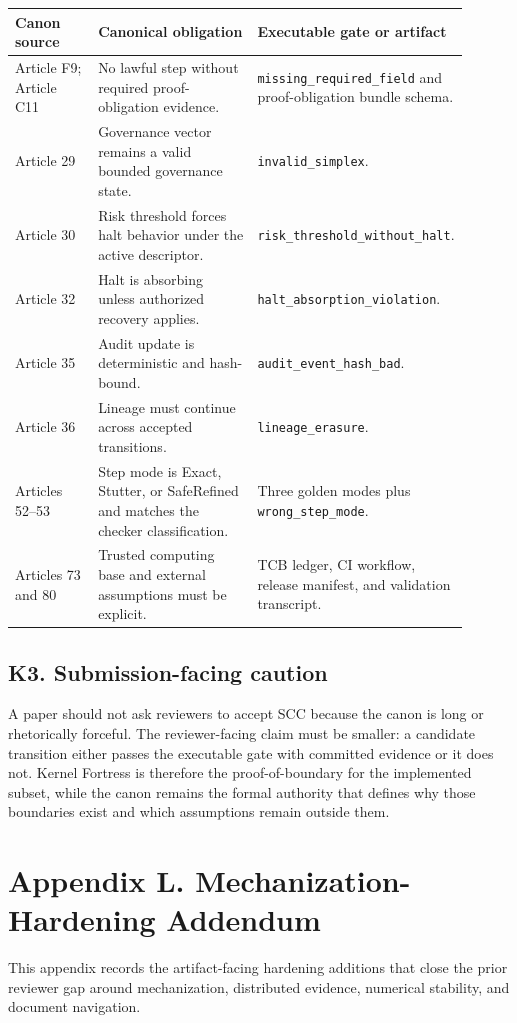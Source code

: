 \documentclass[10pt,oneside]{article}
\theoremstyle{definition}
\theoremstyle{remark}
\begin{document}
\begin{longtable}{@{}p{0.20\linewidth}p{0.40\linewidth}p{0.30\linewidth}@{}}
\toprule
\textbf{Canon source} & \textbf{Canonical obligation} & \textbf{Executable gate or artifact} \\
\midrule
Article F9; Article C11 & No lawful step without required proof-obligation evidence. & \texttt{missing\_required\_field} and proof-obligation bundle schema. \\
Article 29 & Governance vector remains a valid bounded governance state. & \texttt{invalid\_simplex}. \\
Article 30 & Risk threshold forces halt behavior under the active descriptor. & \texttt{risk\_threshold\_without\_halt}. \\
Article 32 & Halt is absorbing unless authorized recovery applies. & \texttt{halt\_absorption\_violation}. \\
Article 35 & Audit update is deterministic and hash-bound. & \texttt{audit\_event\_hash\_bad}. \\
Article 36 & Lineage must continue across accepted transitions. & \texttt{lineage\_erasure}. \\
Articles 52--53 & Step mode is Exact, Stutter, or SafeRefined and matches the checker classification. & Three golden modes plus \texttt{wrong\_step\_mode}. \\
Articles 73 and 80 & Trusted computing base and external assumptions must be explicit. & TCB ledger, CI workflow, release manifest, and validation transcript. \\
\bottomrule
\end{longtable}

\subsection*{K3. Submission-facing caution}
A paper should not ask reviewers to accept SCC because the canon is long or rhetorically forceful. The reviewer-facing claim must be smaller: a candidate transition either passes the executable gate with committed evidence or it does not. Kernel Fortress is therefore the proof-of-boundary for the implemented subset, while the canon remains the formal authority that defines why those boundaries exist and which assumptions remain outside them.


\section{Appendix L. Mechanization-Hardening Addendum}
This appendix records the artifact-facing hardening additions that close the prior reviewer gap around mechanization, distributed evidence, numerical stability, and document navigation.
\end{document}
